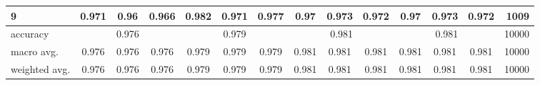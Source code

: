 \documentclass[reprint,english,notitlepage, floatfix]{revtex4-2}  %
\begin{document}
\begin{table}[htbp]
{\begin{tabular}{lccccccccccccr}
9 & 0.971 & 0.96 & 0.966 & 0.982 & 0.971 & 0.977 & 0.97 & 0.973 & 0.972 & 0.97 & 0.973 & 0.972 & 1009 \\
\midrule
accuracy & \multicolumn{3}{c}{0.976} & \multicolumn{3}{c}{0.979} & \multicolumn{3}{c}{0.981} & \multicolumn{3}{c}{0.981} & 10000 \\
macro avg. & 0.976 & 0.976 & 0.976 & 0.979 & 0.979 & 0.979 & 0.981 & 0.981 & 0.981 & 0.981 & 0.981 & 0.981 & 10000 \\
weighted avg. & 0.976 & 0.976 & 0.976 & 0.979 & 0.979 & 0.979 & 0.981 & 0.981 & 0.981 & 0.981 & 0.981 & 0.981 & 10000 \\
\bottomrule
\end{tabular}%
}
\end{table} 
\clearpage

\scriptsize
\setlength{\tabcolsep}{4pt}
\end{document}
